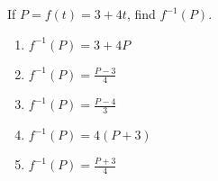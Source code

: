 \bigskip

\item If $P = f(t) = 3 + 4t$, find $f^{-1}(P)$.

\begin{enumerate}
\item $f^{-1}(P) = 3+4P$
\item $f^{-1}(P) = \frac{P-3}{4}$
\item $f^{-1}(P) = \frac{P-4}{3}$
\item $f^{-1}(P) = 4(P+3)$
\item $f^{-1}(P) = \frac{P+3}{4}$
\end{enumerate}

